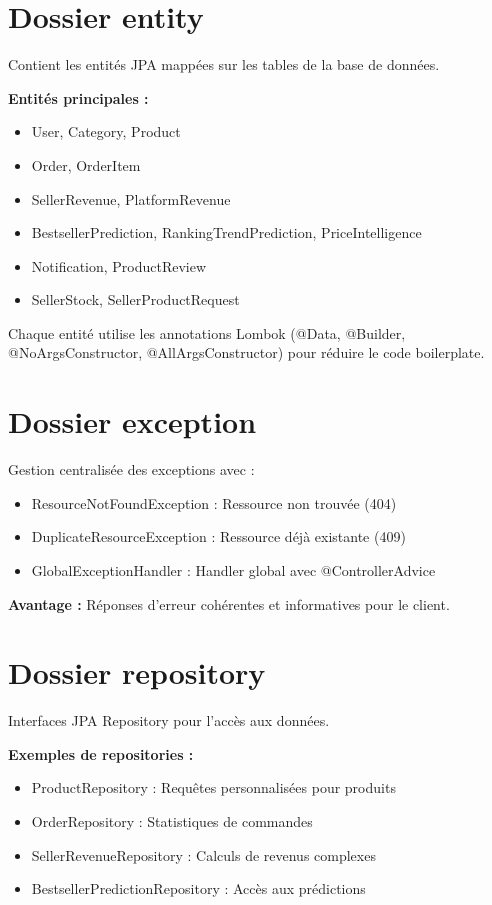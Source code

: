 \documentclass[12pt,a4paper]{report}
\begin{document}
\section{Dossier entity}

Contient les entités JPA mappées sur les tables de la base de données.

\textbf{Entités principales :}
\begin{itemize}[noitemsep]
    \item User, Category, Product
    \item Order, OrderItem
    \item SellerRevenue, PlatformRevenue
    \item BestsellerPrediction, RankingTrendPrediction, PriceIntelligence
    \item Notification, ProductReview
    \item SellerStock, SellerProductRequest
\end{itemize}

Chaque entité utilise les annotations Lombok (@Data, @Builder, @NoArgsConstructor, @AllArgsConstructor) pour réduire le code boilerplate.

\section{Dossier exception}

Gestion centralisée des exceptions avec :
\begin{itemize}[noitemsep]
    \item ResourceNotFoundException : Ressource non trouvée (404)
    \item DuplicateResourceException : Ressource déjà existante (409)
    \item GlobalExceptionHandler : Handler global avec @ControllerAdvice
\end{itemize}

\textbf{Avantage :} Réponses d'erreur cohérentes et informatives pour le client.

\section{Dossier repository}

Interfaces JPA Repository pour l'accès aux données.

\textbf{Exemples de repositories :}
\begin{itemize}[noitemsep]
    \item ProductRepository : Requêtes personnalisées pour produits
    \item OrderRepository : Statistiques de commandes
    \item SellerRevenueRepository : Calculs de revenus complexes
    \item BestsellerPredictionRepository : Accès aux prédictions
\end{itemize}
\end{document}
